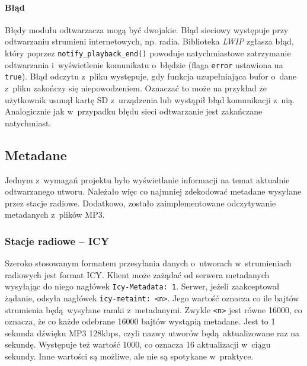 \documentclass[polish]{aghengthesis}
\begin{document}
			\paragraph{Błąd}
				Błędy modułu odtwarzacza mogą być dwojakie. Błąd sieciowy występuje przy odtwarzaniu strumieni internetowych, np. radia. Biblioteka \textit{LWIP} zgłasza błąd, który poprzez \lstinline|notify_playback_end()| powoduje natychmiastowe zatrzymanie odtwarzania i~wyświetlenie komunikatu o~błędzie (flaga \lstinline|error| ustawiona na \lstinline|true|). Błąd odczytu z~pliku występuje, gdy funkcja uzupełniająca bufor o~dane z~pliku zakończy się niepowodzeniem. Oznaczać to może na przykład że użytkownik usunął kartę SD z~urządzenia lub wystąpił błąd komunikacji z~nią. Analogicznie jak w~przypadku błędu sieci odtwarzanie jest zakańczane natychmiast.
			
		\subsection{Metadane}
		Jednym z~wymagań projektu było wyświetlanie informacji na temat aktualnie odtwarzanego utworu. Należało więc co najmniej zdekodować metadane wysyłane przez stacje radiowe. Dodatkowo, zostało zaimplementowane odczytywanie metadanych z~plików MP3.
		
		\subsubsection{Stacje radiowe -- ICY}
			Szeroko stosowanym formatem przesyłania danych o~utworach w~strumieniach radiowych jest format ICY\textsuperscript{\cite{icy_spec}}. Klient może zażądać od serwera metadanych wysyłając do niego nagłówek \lstinline|Icy-Metadata: 1|. Serwer, jeżeli zaakceptował żądanie, odsyła nagłówek \lstinline|icy-metaint: <n>|. Jego wartość oznacza co ile bajtów strumienia będą wysyłane ramki z~metadanymi. Zwykle \lstinline|<n>| jest równe 16000, co oznacza, że co każde odebrane 16000 bajtów wystąpią metadane. Jest to 1 sekunda dźwięku MP3 128kbps, czyli nazwy utworów będą aktualizowane raz na sekundę. Występuje też wartość 1000, co oznacza 16 aktualizacji w~ciągu sekundy. Inne wartości są możliwe, ale nie są spotykane w~praktyce.
			$ $\\
			
\end{document}
